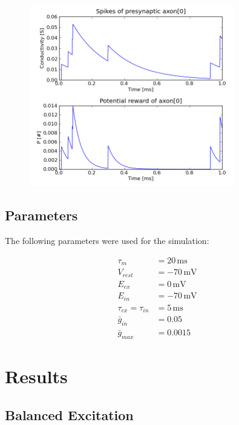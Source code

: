 \documentclass[a4paper,12pt,oneside]{article}
\newcommand{\unit}[1]{\ensuremath{\, \mathrm{#1}}}
\begin{document}
	\begin{figure}[h]
		\centering
		\includegraphics[width=0.8\textwidth]{graphics/demo/fig01}
		\caption{ }
		\label{fig:2.2}
	\end{figure}
	

\subsection{Parameters}

The following parameters were used for the simulation:

\begin{align*}
  \tau_m &= 20\unit{ms} \\
  V_{rest} &= -70\unit{mV} \\
  E_{ex} &= 0\unit{mV} \\
  E_{in} &= -70\unit{mV} \\
  \tau_{ex} = \tau_{in} &= 5\unit{ms} \\
  \bar{g}_{in} &= 0.05 \\
  \bar{g}_{max} &= 0.0015
\end{align*}

\section{Results}

	\subsection{Balanced Excitation} 
		\label{sub:3.1}
	
\end{document}
